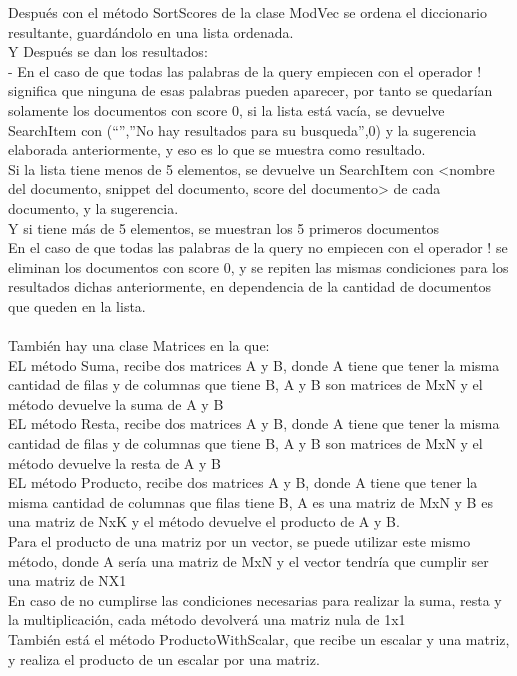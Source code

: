 \documentclass[12pt, a4paper]{article}
\begin{document}
\begin{enumerate}
          Después con el método SortScores de la clase ModVec se ordena el diccionario 
          resultante, guardándolo en una lista ordenada.\\
          Y Después se dan los resultados:\\
          - En el caso de que todas las palabras de la query empiecen con el operador ! 
          significa que ninguna de esas palabras pueden aparecer, 
          por tanto se quedarían solamente los documentos con score 0, 
          si la lista está vacía, se devuelve SearchItem con 
          (“”,”No hay resultados para su busqueda”,0) y 
          la sugerencia elaborada anteriormente, y eso es lo que se muestra como resultado.\\
          Si la lista tiene menos de 5 elementos, se devuelve un SearchItem con 
          <nombre del documento, snippet del documento, score del documento> 
          de cada documento, y la sugerencia.\\
          Y si tiene más de 5 elementos, se muestran los 5 primeros documentos\\
          En el caso de que todas las palabras de la query no empiecen con el operador !
          se eliminan los documentos con score 0, y se repiten las mismas condiciones 
          para los resultados dichas anteriormente, en dependencia de la cantidad de 
          documentos que queden en la lista.\\
          \\
          También hay una clase Matrices en la que:\\
          
          EL método Suma, recibe dos matrices A y B, donde A tiene que tener 
          la misma cantidad de filas y de columnas que tiene B, A y B son matrices de MxN 
          y el método devuelve la suma de A y B\\
          EL método Resta, recibe dos matrices A y B, donde A tiene que tener la 
          misma cantidad de filas y de columnas que tiene B, A y B son matrices de MxN y 
          el método devuelve la resta de A y B\\
          EL método Producto, recibe dos matrices A y B, donde A tiene que tener la misma 
          cantidad de columnas que filas tiene B, A es una matriz de MxN y B es una matriz 
          de NxK y el método devuelve el producto de A y B.\\
          Para el producto de una matriz por un vector, se puede utilizar este mismo método, 
          donde A sería una matriz de MxN y el vector tendría que cumplir ser una matriz 
          de NX1\\
          En caso de no cumplirse las condiciones necesarias para realizar la suma, resta y 
          la multiplicación, cada método devolverá una matriz nula de 1x1\\
          También está el método ProductoWithScalar, 
          que recibe un escalar y una matriz, y realiza el producto de un escalar por una 
          matriz.\\







\end{enumerate}
\end{document}
